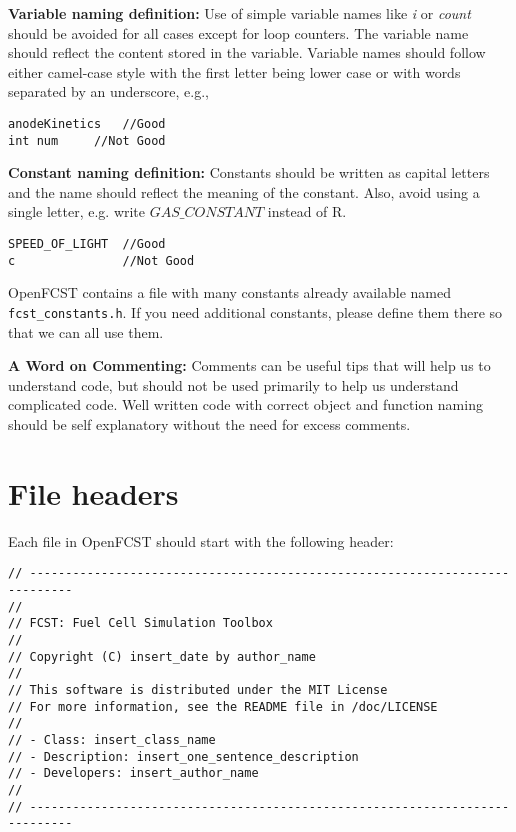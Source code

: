 \textbf{Variable naming definition:} Use of simple variable names like \emph{i} or \emph{count} should be avoided for all cases except for loop counters. The variable name should reflect the content stored in the variable. Variable names should follow either camel-case style with the first letter being lower case or with words separated by an underscore, e.g.,

\begin{lstlisting}
anodeKinetics	//Good
int num		//Not Good
\end{lstlisting}
  
\textbf{Constant naming definition:} Constants should be written as capital letters and the name should reflect the meaning of the constant. Also, avoid using a single letter, e.g. write $GAS\_CONSTANT$ instead of R. 
\begin{lstlisting}
SPEED_OF_LIGHT	//Good
c               //Not Good
\end{lstlisting}
OpenFCST contains a file with many constants already available named \texttt{fcst\_constants.h}. If you need additional constants, please define them there so that we can all use them.

\textbf{A Word on Commenting:} Comments can be useful tips that will help us to understand code, but should not be used primarily to help us understand complicated code. Well written code with
correct object and function naming should be self explanatory without the need for excess comments.

\section{File headers}
Each file in OpenFCST should start with the following header:

\begin{lstlisting}
// ----------------------------------------------------------------------------
//
// FCST: Fuel Cell Simulation Toolbox
//
// Copyright (C) insert_date by author_name
//
// This software is distributed under the MIT License
// For more information, see the README file in /doc/LICENSE
//
// - Class: insert_class_name
// - Description: insert_one_sentence_description
// - Developers: insert_author_name
//               
// ----------------------------------------------------------------------------
\end{lstlisting}

